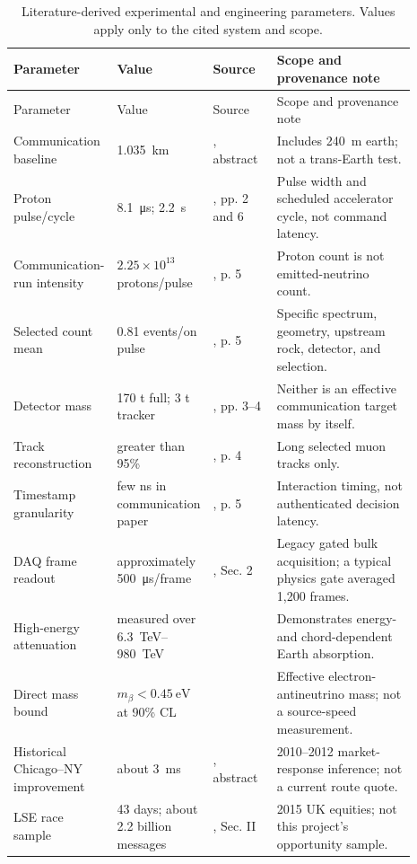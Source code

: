 \documentclass[11pt]{article}
\begin{document}
\begingroup
\small
\setlength{\tabcolsep}{4pt}
\begin{longtable}{L{0.20\linewidth}L{0.18\linewidth}L{0.16\linewidth}L{0.35\linewidth}}
\caption{Literature-derived experimental and engineering parameters. Values apply only to the cited system and scope.}\label{tab:literature-parameters}\\
\toprule
Parameter & Value & Source & Scope and provenance note \\
\midrule
\endfirsthead
\toprule
Parameter & Value & Source & Scope and provenance note \\
\midrule
\endhead
Communication baseline & \SI{1.035}{\kilo\metre} & \citet{Stancil2012}, abstract & Includes \SI{240}{\metre} earth; not a trans-Earth test. \\
Proton pulse/cycle & \SI{8.1}{\micro\second}; \SI{2.2}{\second} & \citet{Stancil2012}, pp. 2 and 6 & Pulse width and scheduled accelerator cycle, not command latency. \\
Communication-run intensity & $2.25\times10^{13}$ protons/pulse & \citet{Stancil2012}, p. 5 & Proton count is not emitted-neutrino count. \\
Selected count mean & 0.81 events/on pulse & \citet{Stancil2012}, p. 5 & Specific spectrum, geometry, upstream rock, detector, and selection. \\
Detector mass & 170 t full; 3 t tracker & \citet{Stancil2012}, pp. 3--4 & Neither is an effective communication target mass by itself. \\
Track reconstruction & greater than 95\% & \citet{Stancil2012}, p. 4 & Long selected muon tracks only. \\
Timestamp granularity & few ns in communication paper & \citet{Stancil2012}, p. 5 & Interaction timing, not authenticated decision latency. \\
DAQ frame readout & approximately \SI{500}{\micro\second}/frame & \citet{Perdue2012}, Sec. 2 & Legacy gated bulk acquisition; a typical physics gate averaged 1,200 frames. \\
High-energy attenuation & measured over \SIrange{6.3}{980}{\tera\electronvolt} & \citet{IceCube2017} & Demonstrates energy- and chord-dependent Earth absorption. \\
Direct mass bound & $m_{\beta}<\SI{0.45}{\electronvolt}$ at 90\% CL & \citet{KATRIN2025} & Effective electron-antineutrino mass; not a source-speed measurement. \\
Historical Chicago--NY improvement & about \SI{3}{\milli\second} & \citet{Laughlin2014}, abstract & 2010--2012 market-response inference; not a current route quote. \\
LSE race sample & 43 days; about 2.2 billion messages & \citet{Aquilina2022}, Sec. II & 2015 UK equities; not this project's opportunity sample. \\
\bottomrule
\end{longtable}
\endgroup
\end{document}
